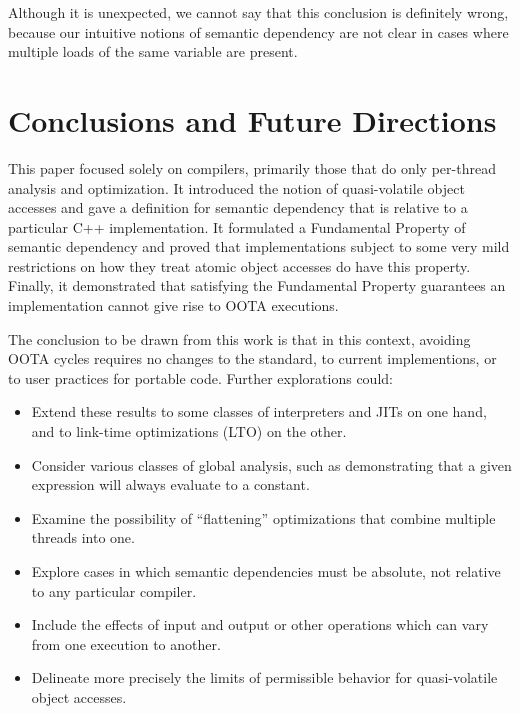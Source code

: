 Although it is unexpected, we cannot say that this conclusion is
definitely wrong, because our intuitive notions of semantic
dependency are not clear in cases where multiple loads of the same
variable are present.

\section{Conclusions and Future Directions}
\label{sec:Conclusions and Future Directions}

This paper focused solely on compilers, primarily those that do only
per-thread analysis and optimization.
It introduced the notion of quasi-volatile object accesses and gave
a definition for semantic dependency that is relative to a particular
C++ implementation.
It formulated a Fundamental Property of semantic dependency and proved
that implementations subject to some very mild restrictions on how
they treat atomic object accesses do have this property.
Finally, it demonstrated that satisfying the Fundamental Property
guarantees an implementation cannot give rise to OOTA executions.

The conclusion to be drawn from this work is that in this context,
avoiding OOTA cycles requires no changes to the standard,
to current implementions, or to user practices for portable code.
Further explorations could:
\begin{itemize}
\item	Extend these results to some classes of interpreters and JITs
	on one hand, and to link-time optimizations (LTO) on the other.
\item	Consider various classes of global analysis, such as
	demonstrating that a given expression will always evaluate
	to a constant.
\item	Examine the possibility of ``flattening'' optimizations that
	combine multiple threads into one.
\item	Explore cases in which semantic dependencies must be absolute,
	not relative to any particular compiler.
\item	Include the effects of input and output or other operations
	which can vary from one execution to another.
\item	Delineate more precisely the limits of permissible behavior
	for quasi-volatile object accesses.
\end{itemize}


